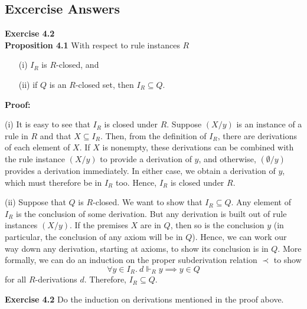 \subsection{Excercise Answers}
\begin{question} \textbf{Exercise 4.2} \\
    \textbf{Proposition 4.1} With respect to rule instances \( R \)
    \begin{enumerate}
        \item[(i)] \( I_R \) is \( R \)-closed, and
        \item[(ii)] if \( Q \) is an \( R \)-closed set, then \( I_R \subseteq Q \).
    \end{enumerate}

    \textbf{Proof:}

    (i) It is easy to see that \( I_R \) is closed under \( R \). Suppose \( (X / y) \) is an instance of a rule in \( R \) and that \( X \subseteq I_R \). Then, from the definition of \( I_R \), there are derivations of each element of \( X \). If \( X \) is nonempty, these derivations can be combined with the rule instance \( (X / y) \) to provide a derivation of \( y \), and otherwise, \( (\emptyset / y) \) provides a derivation immediately. In either case, we obtain a derivation of \( y \), which must therefore be in \( I_R \) too. Hence, \( I_R \) is closed under \( R \).

    (ii) Suppose that \( Q \) is \( R \)-closed. We want to show that \( I_R \subseteq Q \). Any element of \( I_R \) is the conclusion of some derivation. But any derivation is built out of rule instances \( (X / y) \). If the premises \( X \) are in \( Q \), then so is the conclusion \( y \) (in particular, the conclusion of any axiom will be in \( Q \)). Hence, we can work our way down any derivation, starting at axioms, to show its conclusion is in \( Q \). More formally, we can do an induction on the proper subderivation relation \( \prec \) to show
    \[
    \forall y \in I_R. \ d \Vdash_R y \implies y \in Q
    \]
    for all \( R \)-derivations \( d \). Therefore, \( I_R \subseteq Q \).

    \textbf{Exercise 4.2} Do the induction on derivations mentioned in the proof above.
\end{question}


